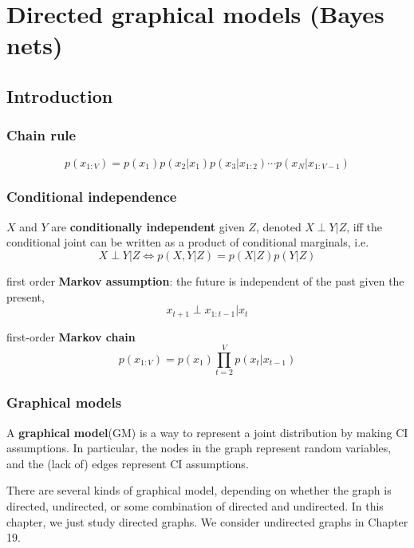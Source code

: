 \chapter{Directed graphical models (Bayes nets)}
\label{chap:DGM}

\section{Introduction}


\subsection{Chain rule}
\begin{equation}
p(x_{1:V}) = p(x_1)p(x_2|x_1)p(x_3|x_{1:2})\cdots p(x_N|x_{1:V-1})
\end{equation}

\subsection{Conditional independence}
$X$ and $Y$ are \textbf{conditionally independent} given $Z$, denoted $X \perp Y|Z$, iff the conditional joint can be written as a product of conditional marginals, i.e.
\begin{equation}
X \perp Y|Z \Longleftrightarrow p(X,Y|Z)=p(X|Z)p(Y|Z)
\end{equation}

first order \textbf{Markov assumption}: the future is independent of the past given the present, 
\begin{equation}
x_{t+1} \perp x_{1:t-1}|x_t
\end{equation}

first-order \textbf{Markov chain}
\begin{equation}
p(x_{1:V}) = p(x_1)\prod\limits_{t=2}^V p(x_t|x_{t-1})
\end{equation}


\subsection{Graphical models}
A \textbf{graphical model}(GM) is a way to represent a joint distribution by making CI assumptions. In particular, the nodes in the graph represent random variables, and the (lack of) edges represent CI assumptions.

There are several kinds of graphical model, depending on whether the graph is directed, undirected, or some combination of directed and undirected. In this chapter, we just study directed graphs. We consider undirected graphs in Chapter 19.



